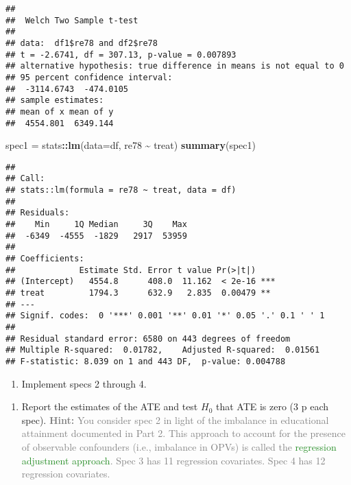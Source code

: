 \documentclass[
]{article}
\newenvironment{Shaded}{\begin{snugshade}}{\end{snugshade}}
\newcommand{\AttributeTok}[1]{\textcolor[rgb]{0.13,0.29,0.53}{#1}}
\newcommand{\FunctionTok}[1]{\textcolor[rgb]{0.13,0.29,0.53}{\textbf{#1}}}
\newcommand{\NormalTok}[1]{#1}
\newcommand{\OtherTok}[1]{\textcolor[rgb]{0.56,0.35,0.01}{#1}}
\newcommand{\SpecialCharTok}[1]{\textcolor[rgb]{0.81,0.36,0.00}{\textbf{#1}}}
\providecommand{\tightlist}{%
  \setlength{\itemsep}{0pt}\setlength{\parskip}{0pt}}
\begin{document}
\begin{Shaded}
\end{Shaded}

\begin{verbatim}
## 
##  Welch Two Sample t-test
## 
## data:  df1$re78 and df2$re78
## t = -2.6741, df = 307.13, p-value = 0.007893
## alternative hypothesis: true difference in means is not equal to 0
## 95 percent confidence interval:
##  -3114.6743  -474.0105
## sample estimates:
## mean of x mean of y 
##  4554.801  6349.144
\end{verbatim}

\begin{Shaded}
\begin{Highlighting}[]
\NormalTok{spec1 }\OtherTok{=}\NormalTok{ stats}\SpecialCharTok{::}\FunctionTok{lm}\NormalTok{(}\AttributeTok{data=}\NormalTok{df, re78 }\SpecialCharTok{\textasciitilde{}}\NormalTok{ treat)}
\FunctionTok{summary}\NormalTok{(spec1)}
\end{Highlighting}
\end{Shaded}

\begin{verbatim}
## 
## Call:
## stats::lm(formula = re78 ~ treat, data = df)
## 
## Residuals:
##    Min     1Q Median     3Q    Max 
##  -6349  -4555  -1829   2917  53959 
## 
## Coefficients:
##             Estimate Std. Error t value Pr(>|t|)    
## (Intercept)   4554.8      408.0  11.162  < 2e-16 ***
## treat         1794.3      632.9   2.835  0.00479 ** 
## ---
## Signif. codes:  0 '***' 0.001 '**' 0.01 '*' 0.05 '.' 0.1 ' ' 1
## 
## Residual standard error: 6580 on 443 degrees of freedom
## Multiple R-squared:  0.01782,    Adjusted R-squared:  0.01561 
## F-statistic: 8.039 on 1 and 443 DF,  p-value: 0.004788
\end{verbatim}

\begin{enumerate}
\def\labelenumi{\arabic{enumi}.}
\setcounter{enumi}{1}
\tightlist
\item
  Implement specs 2 through 4.
\end{enumerate}

\begin{enumerate}
\def\labelenumi{\alph{enumi}.}
\tightlist
\item
  Report the estimates of the ATE and test \(H_0\) that ATE is zero (3 p
  each spec).
  \textcolor{gray}{\textbf{Hint:} You consider spec 2 in light of the imbalance in educational attainment documented in Part 2. This approach to account for the presence of observable confounders (i.e., imbalance in OPVs) is called the \textcolor{ForestGreen}{regression adjustment approach}. Spec 3 has 11 regression covariates. Spec 4 has 12 regression covariates.}
\end{enumerate}
\end{document}

